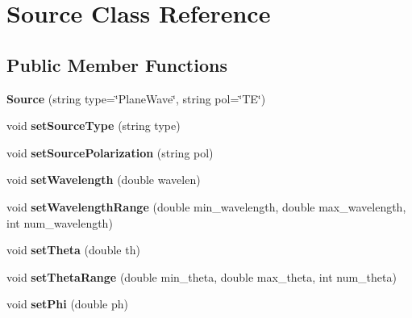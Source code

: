 \hypertarget{class_source}{}\section{Source Class Reference}
\label{class_source}
\subsection*{Public Member Functions}
\begin{DoxyCompactItemize}
\item 
{\bfseries Source} (string type=\char`\"{}Plane\+Wave\char`\"{}, string pol=\char`\"{}TE\char`\"{})\hypertarget{class_source_a52ef958bf3911fcb6662698aaad18271}{}\label{class_source_a52ef958bf3911fcb6662698aaad18271}

\item 
void {\bfseries set\+Source\+Type} (string type)\hypertarget{class_source_a51df02e27c55f2066b05184f59f2ad80}{}\label{class_source_a51df02e27c55f2066b05184f59f2ad80}

\item 
void {\bfseries set\+Source\+Polarization} (string pol)\hypertarget{class_source_a92dcd0ff856218b5301e7abdb78bccf4}{}\label{class_source_a92dcd0ff856218b5301e7abdb78bccf4}

\item 
void {\bfseries set\+Wavelength} (double wavelen)\hypertarget{class_source_a12a661db7dd1b68b6c91e647400c4725}{}\label{class_source_a12a661db7dd1b68b6c91e647400c4725}

\item 
void {\bfseries set\+Wavelength\+Range} (double min\+\_\+wavelength, double max\+\_\+wavelength, int num\+\_\+wavelength)\hypertarget{class_source_af5ab7b26582211daa4c9b5592ccf2ef2}{}\label{class_source_af5ab7b26582211daa4c9b5592ccf2ef2}

\item 
void {\bfseries set\+Theta} (double th)\hypertarget{class_source_ab320da69b11b38f3c9dc1705d8df4dbc}{}\label{class_source_ab320da69b11b38f3c9dc1705d8df4dbc}

\item 
void {\bfseries set\+Theta\+Range} (double min\+\_\+theta, double max\+\_\+theta, int num\+\_\+theta)\hypertarget{class_source_aa0f6a1f07e190e2b91f009fa7bc33967}{}\label{class_source_aa0f6a1f07e190e2b91f009fa7bc33967}

\item 
void {\bfseries set\+Phi} (double ph)\hypertarget{class_source_acd8d93194265317b3a1325be741228df}{}\label{class_source_acd8d93194265317b3a1325be741228df}


\end{DoxyCompactItemize}
